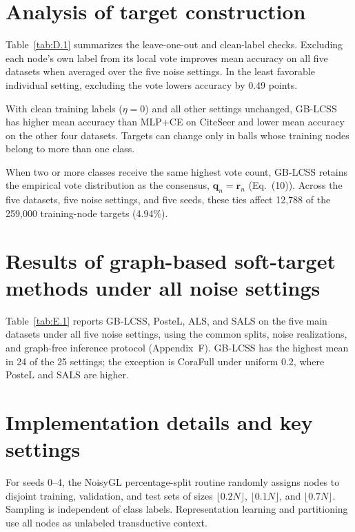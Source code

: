 \documentclass[times,10pt]{elsarticle}
\begin{document}
\section{Analysis of target construction}\label{sec:D}

Table~\ref{tab:D.1} summarizes the leave-one-out and clean-label checks. Excluding each node's own label from its local vote improves mean accuracy on all five datasets when averaged over the five noise settings. In the least favorable individual setting, excluding the vote lowers accuracy by 0.49 points.

With clean training labels (\(\eta=0\)) and all other settings unchanged, GB-LCSS has higher mean accuracy than MLP+CE on CiteSeer and lower mean accuracy on the other four datasets. Targets can change only in balls whose training nodes belong to more than one class.



When two or more classes receive the same highest vote count, GB-LCSS retains the empirical vote distribution as the consensus, \(\mathbf q_n=\mathbf r_n\) (Eq.~(10)). Across the five datasets, five noise settings, and five seeds, these ties affect 12,788 of the 259,000 training-node targets (4.94\%).

\setcounter{table}{0}

\section{Results of graph-based soft-target methods under all noise settings}\label{sec:E}

Table~\ref{tab:E.1} reports GB-LCSS, PosteL, ALS, and SALS on the five main datasets under all five noise settings, using the common splits, noise realizations, and graph-free inference protocol (Appendix~F). GB-LCSS has the highest mean in 24 of the 25 settings; the exception is CoraFull under uniform 0.2, where PosteL and SALS are higher.


\setcounter{table}{0}

\section{Implementation details and key settings}\label{sec:F}

For seeds 0--4, the NoisyGL percentage-split routine randomly assigns nodes to disjoint training, validation, and test sets of sizes \(\lfloor 0.2N\rfloor\), \(\lfloor 0.1N\rfloor\), and \(\lfloor 0.7N\rfloor\). Sampling is independent of class labels. Representation learning and partitioning use all nodes as unlabeled transductive context.
\end{document}
